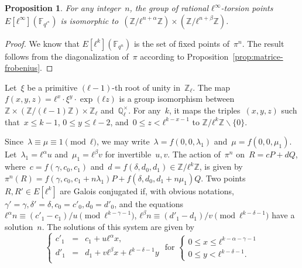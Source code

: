 \documentclass{lms}
\newcommand{\todo}[1]{{\color{red}TODO: #1}}
\newtheorem{prop}[thm]{Proposition}
\newcommand{\F}{\mathbb{F}}
\begin{document}
\begin{prop}\label{prop:l-torsion-rationnelle}
For any integer~$n$,
the group of rational $ℓ^∞$-torsion points~$E[ℓ^∞](\F_{q^{ℓ^n}})$
is isomorphic to~$(ℤ/ℓ^{n+α} ℤ) × (ℤ/ℓ^{n + β} ℤ)$.
\end{prop}
\begin{proof}
We know that $E[ℓ^k](\F_{q^n})$ is the set of fixed points of~$π^n$.
The result follows from the diagonalization of~$π$
according to Proposition~\ref{prop:matrice-frobenius}.
\end{proof}

% 

Let~$ξ$ be a primitive $(ℓ-1)$-th root of unity in~$ℤ_ℓ$.
The map~$f(x, y, z) = ℓ^x· ξ^y· \exp (ℓ z)$
is a group isomorphism between~$ℤ × (ℤ/(ℓ-1) ℤ) × ℤ_ℓ$ and~$ℚ_ℓ^{×}$.
For any~$k$, it maps the triples~$(x, y, z)$
such that~$x ≤ k-1$, $0 ≤ y ≤ ℓ-2$, and~$0 ≤ z < ℓ^{k - x - 1}$
to $ℤ/ℓ^{k} ℤ ∖ \{0\}$.

Since~$λ ≡ μ ≡ 1 \pmod{ℓ}$,
we may write~$λ = f(0, 0, λ_1)$ and~$μ = f(0, 0, μ_1)$.
Let~$λ_1 = ℓ^α u$ and~$μ_1 = ℓ^β v$ for invertible~$u, v$.
The action of~$π^n$ on~$R = c P + d Q$,
where~$c = f(γ, c_0, c_1)$ and~$d = f(δ, d_0, d_1) ∈ ℤ/ℓ^{k} ℤ$,
is given by~$π^n (R) = f(γ, c_0, c_1 + n λ_1) P + f(δ, d_0, d_1 + n μ_1) Q$.
Two points~$R, R' ∈ E[ℓ^k]$ are Galois conjugated if, with obvious notations,
$γ' = γ, δ' = δ, c_0 = c'_0, d_0 = d'_0$, and the equations
$ℓ^α n ≡ (c'_1 - c_1)/u \pmod{ℓ^{k-γ-1}}$,
$ℓ^β n ≡ (d'_1 - d_1)/v \pmod{ℓ^{k-δ-1}}$ have a solution~$n$.
The solutions of this system are given by
\begin{equation*}
\left\{\begin{array}{rcl}
c'_1 &=& c_1 + u ℓ^α x,\\
d'_1 &=& d_1 + v ℓ^β x + ℓ^{k-δ-1} y\\\end{array}\right.
\text{ for }\left\{\begin{array}{l}
0 ≤ x ≤ ℓ^{k-α-γ-1}\\
0 ≤ y < ℓ^{k-δ-1}.\end{array}\right.
\end{equation*}
\end{document}
